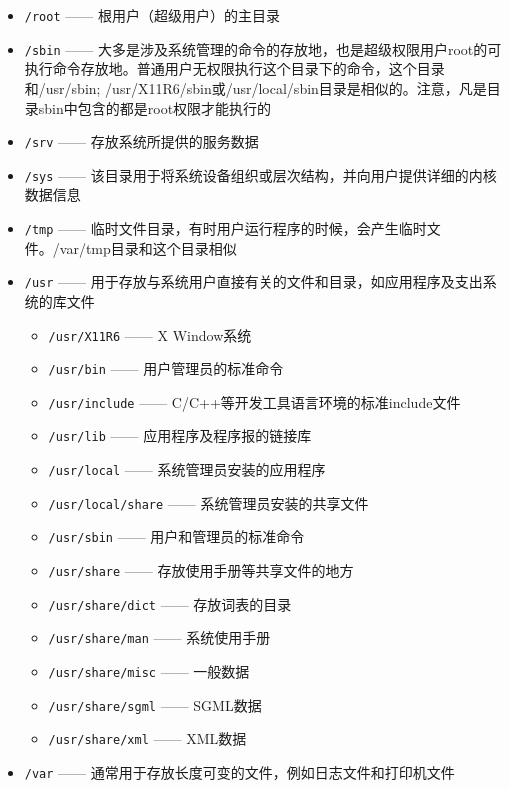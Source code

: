 \documentclass[doctor,openright,twoside]{sjtuthesis}
\providecommand{\tightlist}{%
    \setlength{\itemsep}{0pt}\setlength{\parskip}{0pt}}
\newcommand{\passthrough}[1]{#1}
\theoremstyle{plain}
\theoremstyle{definition}
\theoremstyle{remark}
\theoremstyle{ocrenumbox}
\theoremstyle{plain}
\begin{document}
\begin{itemize}
\item
  \passthrough{\lstinline!/root!} ------ 根用户（超级用户）的主目录
\item
  \passthrough{\lstinline!/sbin!} ------ 大多是涉及系统管理的命令的存放地，也是超级权限用户root的可执行命令存放地。普通用户无权限执行这个目录下的命令，这个目录和/usr/sbin; /usr/X11R6/sbin或/usr/local/sbin目录是相似的。注意，凡是目录sbin中包含的都是root权限才能执行的
\item
  \passthrough{\lstinline!/srv!} ------ 存放系统所提供的服务数据
\item
  \passthrough{\lstinline!/sys!} ------ 该目录用于将系统设备组织或层次结构，并向用户提供详细的内核数据信息
\item
  \passthrough{\lstinline!/tmp!} ------ 临时文件目录，有时用户运行程序的时候，会产生临时文件。/var/tmp目录和这个目录相似
\item
  \passthrough{\lstinline!/usr!} ------ 用于存放与系统用户直接有关的文件和目录，如应用程序及支出系统的库文件

  \begin{itemize}
  \tightlist
  \item
    \passthrough{\lstinline!/usr/X11R6!} ------ X Window系统
  \item
    \passthrough{\lstinline!/usr/bin!} ------ 用户管理员的标准命令
  \item
    \passthrough{\lstinline!/usr/include!} ------ C/C++等开发工具语言环境的标准include文件
  \item
    \passthrough{\lstinline!/usr/lib!} ------ 应用程序及程序报的链接库
  \item
    \passthrough{\lstinline!/usr/local!} ------ 系统管理员安装的应用程序
  \item
    \passthrough{\lstinline!/usr/local/share!} ------ 系统管理员安装的共享文件
  \item
    \passthrough{\lstinline!/usr/sbin!} ------ 用户和管理员的标准命令
  \item
    \passthrough{\lstinline!/usr/share!} ------ 存放使用手册等共享文件的地方
  \item
    \passthrough{\lstinline!/usr/share/dict!} ------ 存放词表的目录
  \item
    \passthrough{\lstinline!/usr/share/man!} ------ 系统使用手册
  \item
    \passthrough{\lstinline!/usr/share/misc!} ------ 一般数据
  \item
    \passthrough{\lstinline!/usr/share/sgml!} ------ SGML数据
  \item
    \passthrough{\lstinline!/usr/share/xml!} ------ XML数据
  \end{itemize}
\item
  \passthrough{\lstinline!/var!} ------ 通常用于存放长度可变的文件，例如日志文件和打印机文件


\end{itemize}
\end{document}
